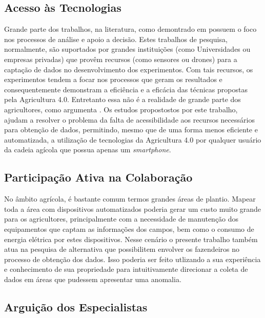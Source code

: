 \subsection{Acesso às Tecnologias}
\label{subsec:acesso_tecnologias}

Grande parte dos trabalhos, na literatura, como demontrado em \cite{Massruha:2017} possuem o foco nos processos de análise e apoio a decisão. Estes trabalhos de pesquisa, normalmente, são suportados por grandes instituições (como Universidades ou empresas privadas) que provêm recursos (como sensores ou drones) para a captação de dados no desenvolvimento dos experimentos. Com tais recursos, os experimentos tendem a focar nos processos que geram os resultados e consequentemente demonstram a eficiência e a eficácia das técnicas propostas pela Agricultura 4.0. Entretanto essa não é a realidade de grande parte dos agricultores, como argumenta \cite{Rose:2019}. Os estudos propostostos por este trabalho, ajudam a resolver o problema da falta de acessibilidade aos recursos necessários para obtenção de dados, permitindo, mesmo que de uma forma menos eficiente e automatizada, a utilização de tecnologias da Agricultura 4.0 por qualquer usuário da cadeia agícola que possua apenas um \textit{smartphone}.

\subsection{Participação Ativa na Colaboração}
\label{subsec:participacao_ativa_colaboracao}

No âmbito agrícola, é bastante comum termos grandes áreas de plantio. Mapear toda a área com dispositivos automatizados poderia gerar um custo muito grande para os agricultores, principalmente com a necessidade de manutenção dos equipamentos que captam as informações dos campos, bem como o consumo de energia elétrica por estes dispositivos. Nesse cenário o presente trabalho também atua na pesquisa de alternativa que possibilitem envolver os fazendeiros no processo de obtenção dos dados. Isso poderia ser feito utlizando a sua experiência e conhecimento de sua propriedade para intuitivamente direcionar a coleta de dados em áreas que pudessem apresentar uma anomalia.

\subsection{Arguição dos Especialistas}
\label{subsec:arquicao_especialistas}

